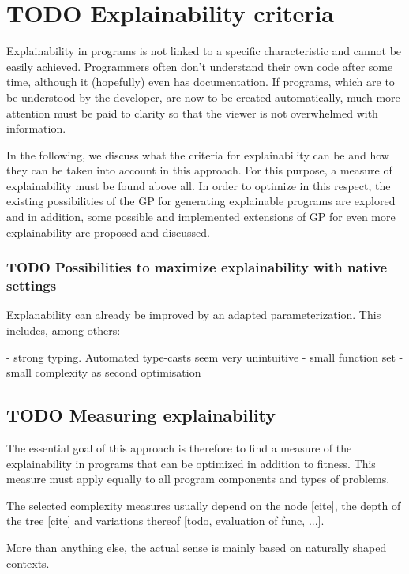 
\section{TODO Explainability criteria}

Explainability in programs is not linked to a specific characteristic and cannot be easily achieved. Programmers often don't understand their own code after some time, although it (hopefully) even has documentation. If programs, which are to be understood by the developer, are now to be created automatically, much more attention must be paid to clarity so that the viewer is not overwhelmed with information.

In the following, we discuss what the criteria for explainability can be and how they can be taken into account in this approach. For this purpose, a measure of explainability must be found above all. In order to optimize in this respect, the existing possibilities of the GP for generating explainable programs are explored and in addition, some possible and implemented extensions of GP for even more explainability are proposed and discussed.


\subsubsection{TODO Possibilities to maximize explainability with native settings}

Explanability can already be improved by an adapted parameterization. This includes, among others:

- strong typing. Automated type-casts seem very unintuitive
- small function set
- small complexity as second optimisation

\subsection{TODO Measuring explainability}


The essential goal of this approach is therefore to find a measure of the explainability in programs that can be optimized in addition to fitness. This measure must apply equally to all program components and types of problems.

The selected complexity measures usually depend on the node [cite], the depth of the tree [cite] and variations thereof [todo, evaluation of func, ...].

More than anything else, the actual sense is mainly based on naturally shaped contexts. 

